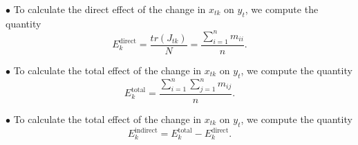 \documentclass[11pt,a4paper]{amsart}
\theoremstyle{plain}
\theoremstyle{definition}
\begin{document}
\vspace{10pt}

$\bullet$ To calculate the direct effect of the change in $x_{tk}$ on $y_{t}$, we compute the quantity
\[	E_{k}^{\text{direct}} = \frac{tr(J_{tk})}{N} = \frac{\sum_{i=1}^{n} m_{ii}}{n}.	\]


\vspace{5pt}

$\bullet$ To calculate the total effect of the change in $x_{tk}$ on $y_{t}$, we compute the quantity
\[	E_{k}^{\text{total}} = \frac{\sum_{i=1}^{n} \sum_{j=1}^{n} m_{ij}}{n}.	\]

$\bullet$ To calculate the total effect of the change in $x_{tk}$ on $y_{t}$, we compute the quantity
\[	E_{k}^{\text{indirect}} =  	E_{k}^{\text{total}} - E_{k}^{\text{direct}}. \]

		
\end{document}
